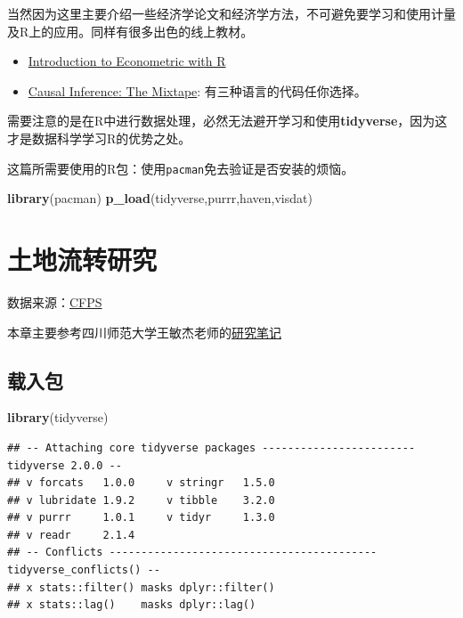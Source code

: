 \documentclass[
  oneside]{book}
\newenvironment{Shaded}{\begin{snugshade}}{\end{snugshade}}
\newcommand{\FunctionTok}[1]{\textcolor[rgb]{0.13,0.29,0.53}{\textbf{#1}}}
\newcommand{\NormalTok}[1]{#1}
\providecommand{\tightlist}{%
  \setlength{\itemsep}{0pt}\setlength{\parskip}{0pt}}
\begin{document}
当然因为这里主要介绍一些经济学论文和经济学方法，不可避免要学习和使用计量及R上的应用。同样有很多出色的线上教材。

\begin{itemize}
\tightlist
\item
  \href{https://www.econometrics-with-r.org/}{Introduction to Econometric with R}
\item
  \href{https://mixtape.scunning.com/}{Causal Inference: The Mixtape}: 有三种语言的代码任你选择。
\end{itemize}

需要注意的是在R中进行数据处理，必然无法避开学习和使用\textbf{tidyverse}，因为这才是数据科学学习R的优势之处。

这篇所需要使用的R包：使用\texttt{pacman}免去验证是否安装的烦恼。

\begin{Shaded}
\begin{Highlighting}[]
\FunctionTok{library}\NormalTok{(pacman)}
\FunctionTok{p\_load}\NormalTok{(tidyverse,purrr,haven,visdat)}
\end{Highlighting}
\end{Shaded}

\hypertarget{ux571fux5730ux6d41ux8f6cux7814ux7a76}{%
\chapter{土地流转研究}\label{ux571fux5730ux6d41ux8f6cux7814ux7a76}}

数据来源：\href{http://www.isss.pku.edu.cn/cfps/index.htm}{CFPS}

本章主要参考四川师范大学王敏杰老师的\href{https://bookdown.org/wangminjie/R4cfps/land.html}{研究笔记}

\hypertarget{ux8f7dux5165ux5305}{%
\section{载入包}\label{ux8f7dux5165ux5305}}

\begin{Shaded}
\begin{Highlighting}[]
\FunctionTok{library}\NormalTok{(tidyverse)}
\end{Highlighting}
\end{Shaded}

\begin{verbatim}
## -- Attaching core tidyverse packages ------------------------ tidyverse 2.0.0 --
## v forcats   1.0.0     v stringr   1.5.0
## v lubridate 1.9.2     v tibble    3.2.0
## v purrr     1.0.1     v tidyr     1.3.0
## v readr     2.1.4     
## -- Conflicts ------------------------------------------ tidyverse_conflicts() --
## x stats::filter() masks dplyr::filter()
## x stats::lag()    masks dplyr::lag()
\end{verbatim}
\end{document}
